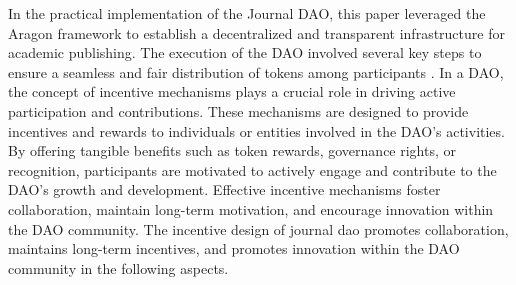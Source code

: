 \documentclass[lettersize,journal]{IEEEtran}
\begin{document}
In the practical implementation of the Journal DAO, this paper leveraged the Aragon framework to establish a decentralized and transparent infrastructure for academic publishing. The execution of the DAO involved several key steps to ensure a seamless and fair distribution of tokens among participants \cite{el2020overview}.
In a DAO, the concept of incentive mechanisms plays a crucial role in driving active participation and contributions. These mechanisms are designed to provide incentives and rewards to individuals or entities involved in the DAO's activities. By offering tangible benefits such as token rewards, governance rights, or recognition, participants are motivated to actively engage and contribute to the DAO's growth and development. Effective incentive mechanisms foster collaboration, maintain long-term motivation, and encourage innovation within the DAO community. The incentive design of journal dao promotes collaboration, maintains long-term incentives, and promotes innovation within the DAO community in the following aspects.
\end{document}
